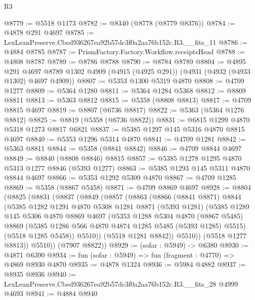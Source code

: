 \begin{lexlean}{R3}
\begin{coremodule}
@8779 := @5518 @1173
@8782 := @8340 (@8778 (@8779 @8376))
@8784 := @4878 @291 @4697
@8785 := LexLeanPreserve.Cbed936267ea92b57dc3f0a2aa76b152c.R3.__fits_11
@8786 := @4884 @8785
@8787 := PrismFactory.Factory.Workflow.receiptsHead
@8788 := @4808 @8787
@8789 := @8786 @8788
@8790 := @8784 @8789
@8804 := @4895
    @291
    @4697
    @8789
    @1302
    @4909
    (@4915 (@4925 @291))
    (@4931 (@4932 (@4933 @1302) @4697 @4909))
@8807 := @5353 @1300 @5319 @4870
@8808 := @4709 @1277
@8809 := @5364 @1280
@8811 := @5364 @1284 @5368
@8812 := @8809 @8811
@8813 := @5363 @8812
@8815 := @5358 (@8808 @8813)
@8817 := @4709 @8815 @4697
@8819 := @8807 (@6736 @8817)
@8822 := @5363 (@5364 @1276 @8812)
@8825 := @8819 (@5358 (@6736 @8822))
@8831 := @6815 @1299 @4870 @5318 @1273 @8817 @6821
@8837 := @5385 @1297 @145 @5316 @4870 @8815 @4697
@8840 := @5353 @1296 @5314 @4870
@8841 := @4709 @1281
@8842 := @5363 @8811
@8844 := @5358 (@8841 @8842)
@8846 := @4709 @8844 @4697
@8849 := @8840 (@8808 @8846) @8815
@8857 := @5385 @1278 @1295 @4870 @5313 @1277 @8846 (@5393 @1277)
@8863 := @5385 @1293 @145 @5311 @4870 @8844 @4697
@8866 := @5353 @1292 @5309 @4870
@8867 := @4709 @1285
@8869 := @5358 (@8867 @5458)
@8871 := @4709 @8869 @4697
@8928 := @8804
    (@8825
      (@8831
        (@8837
          (@8849
            (@8857
              (@8863
                (@8866
                  (@8841 @8871)
                  @8844
                  (@5385
                    @1282
                    @1291
                    @4870
                    @5308
                    @1281
                    @8871
                    (@5393 @1281)
                    (@5385
                      @1289
                      @145
                      @5306
                      @4870
                      @8869
                      @4697
                      (@5353
                        @1288
                        @5304
                        @4870
                        (@8867 @5485)
                        @8869
                        (@5385 @1286 @566 @4870 @4874 @1285 @5485 (@5393 @1285) @5515)
                        (@5518 @1285 @5458))
                      @5510))
                  (@5518 @1281 @8842))
                @5510))
            (@5518 @1277 @8813))
          @5510))
      (@7907 @8822))
@8929 := (sofar : @5949) -> @6380
@8930 := @4871 @6390
@8934 := fun (sofar : @5949) => fun (fragment : @4770) => @4869 @8930 @4870
@8935 := @4878 @1324
@8936 := @5984 @4882
@8937 := @8935 @8936
@8940 := LexLeanPreserve.Cbed936267ea92b57dc3f0a2aa76b152c.R3.__fits_28 @4999 @4693
@8941 := @4884 @8940

\end{coremodule}
\end{lexlean}
